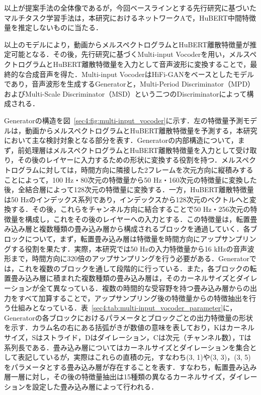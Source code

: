 \documentclass[12pt]{jarticle}
\numberwithin{equation}{section}    %
\numberwithin{figure}{section}      %
\numberwithin{table}{section}      %
\begin{document}
以上が提案手法の全体像であるが，今回ベースラインとする先行研究\cite{choi2023intelligible}に基づいたマルチタスク学習手法は，本研究におけるネットワークAで，HuBERT中間特徴量を推定しないものに当たる．

以上のモデルにより，動画からメルスペクトログラムとHuBERT離散特徴量が推定可能となる．その後，先行研究\cite{choi2023intelligible}に基づくMulti-input Vocoderを用い，メルスペクトログラムとHuBERT離散特徴量を入力として音声波形に変換することで，最終的な合成音声を得た．Multi-input VocoderはHiFi-GAN\cite{kong2020hifi}をベースとしたモデルであり，音声波形を生成するGeneratorと，Multi-Period Discriminator（MPD）およびMulti-Scale Discriminator（MSD）という二つのDiscriminatorによって構成される．

Generatorの構造を図~\ref{sec4:fig:multi-input_vocoder}に示す．左の特徴量予測モデルは，動画からメルスペクトログラムとHuBERT離散特徴量を予測する，本研究において主な検討対象となる部分を表す．Generatorの内部構造について，まず，前処理層はメルスペクトログラムとHuBERT離散特徴量を入力として受け取り，その後のレイヤーに入力するための形状に変換する役割を持つ．メルスペクトログラムに対しては，時間方向に隣接した2フレームを次元方向に縦積みすることによって，100 Hz・80次元の特徴量から50 Hz・160次元の特徴量に変換した後，全結合層によって128次元の特徴量に変換する．一方，HuBERT離散特徴量は50 Hzのインデックス系列であり，インデックスから128次元のベクトルへと変換する．その後，これらをチャンネル方向に結合することで50 Hz・256次元の特徴量を構成し，これをその後のレイヤーへの入力とする．この特徴量は，転置畳み込み層と複数種類の畳み込み層から構成されるブロックを通過していく．各ブロックについて，まず，転置畳み込み層は特徴量を時間方向にアップサンプリングする役割を果たす．実際，本研究では50 Hzの入力特徴量から16 kHzの音声波形まで，時間方向に320倍のアップサンプリングを行う必要がある．Generatorでは，これを複数のブロックを通して段階的に行っている．また，各ブロックの転置畳み込み層に積まれた複数種類の畳み込み層は，そのカーネルサイズとダイレーションが全て異なっている．複数の時間的な受容野を持つ畳み込み層からの出力をすべて加算することで，アップサンプリング後の特徴量からの特徴抽出を行う仕組みとなっている．表~\ref{sec4:tab:multi-input_vocoder_parameter}に，Generatorの各ブロックにおけるパラメータとブロックごとの出力特徴量の形状を示す．カラム名の右にある括弧がきが数値の意味を表しており，Kはカーネルサイズ，Sはストライド，Dはダイレーション，Cは次元（チャンネル数），Tは系列長である．畳み込み層についてはカーネルサイズとダイレーションを集合として表記しているが，実際はこれらの直積の元，すなわち(3, 1)や(3, 3)，(3, 5)をパラメータとする畳み込み層が存在することを表す．すなわち，転置畳み込み層一層に対し，その後の特徴量抽出は15種類の異なるカーネルサイズ，ダイレーションを設定した畳み込み層によって行われる．
\end{document}
